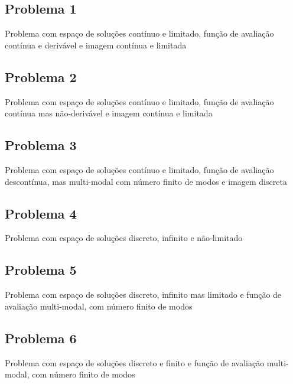 \documentclass[a4paper]{article}
\begin{document}
\subsection{Problema 1}
Problema com espaço de soluções contínuo e limitado, função de avaliação contínua e derivável e imagem contínua e limitada 


\subsection{Problema 2}
Problema com espaço de soluções contínuo e limitado, função de avaliação contínua mas 
não-derivável e imagem contínua e limitada 

\subsection{Problema 3}
Problema com espaço de soluções contínuo e limitado, função de avaliação descontínua, mas multi-modal com número finito de modos e imagem discreta 

\subsection{Problema 4}
Problema com espaço de soluções discreto, infinito e não-limitado 

\subsection{Problema 5}
Problema com espaço de soluções discreto, infinito mas limitado e função de avaliação multi-modal, com número finito de modos 

\subsection{Problema 6}
Problema com espaço de soluções discreto e finito e função de avaliação multi-modal, com número finito de modos 
\end{document}

